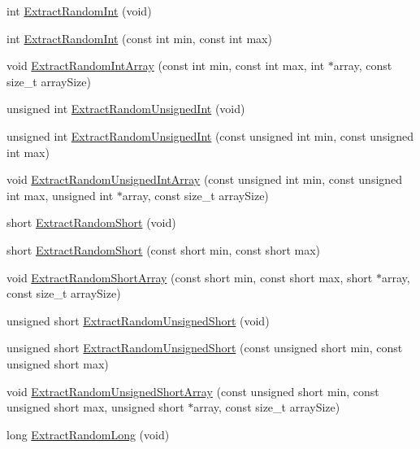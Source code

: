\begin{DoxyCompactItemize}
\item 
int \hyperlink{classcmn_random_sequence_a43628465b5d9270cc9a01fb647c439f1}{Extract\-Random\-Int} (void)
\item 
int \hyperlink{classcmn_random_sequence_adf8538dc7de0bbc1b16a437ba52f2004}{Extract\-Random\-Int} (const int min, const int max)
\item 
void \hyperlink{classcmn_random_sequence_a820ee61c5483e1b049171dc778f06383}{Extract\-Random\-Int\-Array} (const int min, const int max, int $\ast$array, const size\-\_\-t array\-Size)
\item 
unsigned int \hyperlink{classcmn_random_sequence_a7a840800c30ab14108dac2263c420be6}{Extract\-Random\-Unsigned\-Int} (void)
\item 
unsigned int \hyperlink{classcmn_random_sequence_ad2b6355300b3f705c7bf3848be6e18b6}{Extract\-Random\-Unsigned\-Int} (const unsigned int min, const unsigned int max)
\item 
void \hyperlink{classcmn_random_sequence_a8d59e4516f96a0353d06f1969a670d46}{Extract\-Random\-Unsigned\-Int\-Array} (const unsigned int min, const unsigned int max, unsigned int $\ast$array, const size\-\_\-t array\-Size)
\item 
short \hyperlink{classcmn_random_sequence_abdf69962248104b2eee18749c8503e7c}{Extract\-Random\-Short} (void)
\item 
short \hyperlink{classcmn_random_sequence_aff095dc034e2006d00a109c0d1db3853}{Extract\-Random\-Short} (const short min, const short max)
\item 
void \hyperlink{classcmn_random_sequence_ae0858e1f691e1a2e7f796ed5c7449cf3}{Extract\-Random\-Short\-Array} (const short min, const short max, short $\ast$array, const size\-\_\-t array\-Size)
\item 
unsigned short \hyperlink{classcmn_random_sequence_a66257ddc3c2bfb0671535c0ed2384ce8}{Extract\-Random\-Unsigned\-Short} (void)
\item 
unsigned short \hyperlink{classcmn_random_sequence_a49d37a9086b64319943474021f072890}{Extract\-Random\-Unsigned\-Short} (const unsigned short min, const unsigned short max)
\item 
void \hyperlink{classcmn_random_sequence_a1f916447aa7357dbbee73718eadc9665}{Extract\-Random\-Unsigned\-Short\-Array} (const unsigned short min, const unsigned short max, unsigned short $\ast$array, const size\-\_\-t array\-Size)
\item 
long \hyperlink{classcmn_random_sequence_a5dc43256508109a413cdf9090c9c9cfa}{Extract\-Random\-Long} (void)

\end{DoxyCompactItemize}
